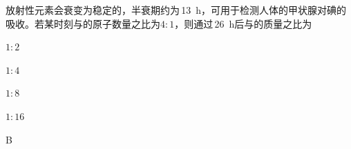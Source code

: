 放射性元素会衰变为稳定的，半衰期约为\,\qty{13}{h}，可用于检测人体的甲状腺对碘的吸收。若某时刻与的原子数量之比为\(4:1\)，则通过\,\qty{26}{h}后与的质量之比为\paren[]
\begin{choices}
	\item \(1:2\)
	\item \(1:4\)
	\item \(1:8\)
	\item \(1:16\)
\end{choices}
\begin{answer}
	B
\end{answer}